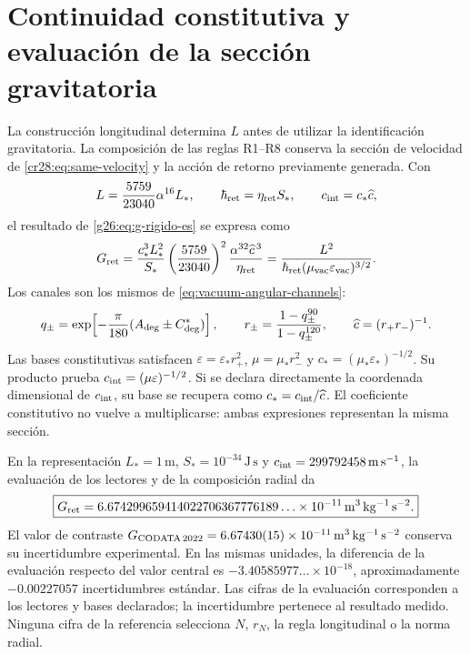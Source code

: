 \section{Continuidad constitutiva y evaluación de la sección gravitatoria}
\label{cr28:sec:radial-evaluation}

La construcción longitudinal determina \(L\) antes de utilizar la
identificación gravitatoria. La composición de las reglas R1--R8 conserva
la sección de velocidad de \eqref{cr28:eq:same-velocity} y la acción
de retorno previamente generada. Con
\[
 L=\frac{5759}{23040}\alpha^{16}L_*,
 \qquad \hbar_{\rm ret}=\eta_{\rm ret}S_*,
 \qquad c_{\rm int}=c_*\widehat c,
\]
el resultado de \eqref{g26:eq:g-rigido-es} se expresa como
\begin{equation}
 G_{\rm ret}
 =\frac{c_*^3L_*^2}{S_*}
   \left(\frac{5759}{23040}\right)^2
   \frac{\alpha^{32}\widehat c^{\,3}}{\eta_{\rm ret}}
 =\frac{L^2}
 {\hbar_{\rm ret}(\mu_{\rm vac}\varepsilon_{\rm vac})^{3/2}}.
 \label{cr28:eq:g-constitutive-evaluation}
\end{equation}
Los canales son los mismos de \eqref{eq:vacuum-angular-channels}:
\[
 q_\pm=\exp\!\left[-\frac{\pi}{180}(A_{\rm deg}\pm C^*_{\rm deg})\right],
 \qquad r_\pm=\frac{1-q_\pm^{90}}{1-q_\pm^{120}},
 \qquad \widehat c=(r_+r_-)^{-1}.
\]
Las bases constitutivas satisfacen
\(\varepsilon=\varepsilon_*r_+^2\),
\(\mu=\mu_*r_-^2\) y
\(c_*=(\mu_*\varepsilon_*)^{-1/2}\). Su producto prueba
\(c_{\rm int}=(\mu\varepsilon)^{-1/2}\). Si se declara directamente
la coordenada dimensional de \(c_{\rm int}\), su base se recupera como
\(c_*=c_{\rm int}/\widehat c\). El coeficiente constitutivo no vuelve
a multiplicarse: ambas expresiones representan la misma sección.

En la representación \(L_*=1\,\mathrm m\),
\(S_*=10^{-34}\,\mathrm{J\,s}\) y
\(c_{\rm int}=299792458\,\mathrm{m\,s^{-1}}\), la evaluación de los
lectores y de la composición radial da
\begin{equation}
 \boxed{
 G_{\rm ret}
 =6.674299659414022706367776189\ldots\times10^{-11}
 \,\mathrm{m^3\,kg^{-1}\,s^{-2}}.}
 \label{cr28:eq:g-evaluation}
\end{equation}
El valor de contraste
\(G_{\rm CODATA\,2022}=6.67430(15)\times10^{-11}\,
\mathrm{m^3\,kg^{-1}\,s^{-2}}\) conserva su incertidumbre
experimental. En las mismas unidades, la diferencia de la evaluación
respecto del valor central es
\(-3.40585977\ldots\times10^{-18}\), aproximadamente
\(-0.00227057\) incertidumbres estándar. Las cifras de la evaluación
corresponden a los lectores y bases declarados; la incertidumbre pertenece
al resultado medido. Ninguna cifra de la referencia selecciona
\(N\), \(r_N\), la regla longitudinal o la norma radial.

